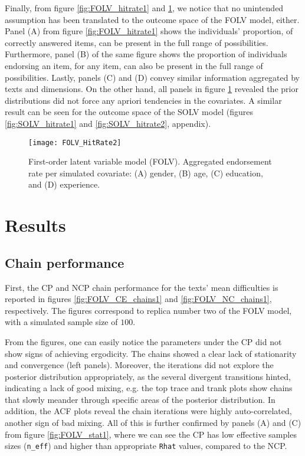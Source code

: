 Finally, from figure \ref{fig:FOLV_hitrate1} and \ref{fig:FOLV_hitrate2}, we notice that no unintended assumption has been translated to the outcome space of the FOLV model, either. Panel (A) from figure \ref{fig:FOLV_hitrate1} shows the individuals'  proportion, of correctly answered items, can be present in the full range of possibilities. Furthermore, panel (B) of the same figure shows the proportion of individuals endorsing an item, for any item, can also be present in the full range of possibilities. Lastly, panels (C) and (D) convey similar information aggregated by texts and dimensions. On the other hand, all panels in figure \ref{fig:FOLV_hitrate2} revealed the prior distributions did not force any apriori tendencies in the covariates. A similar result can be seen for the outcome space of the SOLV model (figures \ref{fig:SOLV_hitrate1} and \ref{fig:SOLV_hitrate2}, appendix).
%
\begin{figure}[h]
	\centering
	\texttt{[image: FOLV\_HitRate2]}
	\caption[First-order latent variable model (FOLV). Hit rate per simulated covariate.]%
	{First-order latent variable model (FOLV). Aggregated endorsement rate per simulated covariate: (A) gender, (B) age, (C) education, and (D) experience.}
	\label{fig:FOLV_hitrate2}
\end{figure}


\section{Results}

\subsection{Chain performance}

First, the CP and NCP chain performance for the texts' mean difficulties is reported in figures \ref{fig:FOLV_CE_chains1} and \ref{fig:FOLV_NC_chains1}, respectively. The figures correspond to replica number two of the FOLV model, with a simulated sample size of $100$. 

From the figures, one can easily notice the parameters under the CP did not show signs of achieving ergodicity. The chains showed a clear lack of stationarity and convergence (left panels). Moreover, the iterations did not explore the posterior distribution appropriately, as the several divergent transitions hinted, indicating a lack of good mixing, e.g. the top trace and trank plots show chains that slowly meander through specific areas of the posterior distribution. In addition, the ACF plots reveal the chain iterations were highly auto-correlated, another sign of bad mixing. All of this is further confirmed by panels (A) and (C) from figure \ref{fig:FOLV_stat1}, where we can see the CP has low effective samples sizes (\texttt{n\_eff}) and higher than appropriate \texttt{Rhat} values, compared to the NCP.

